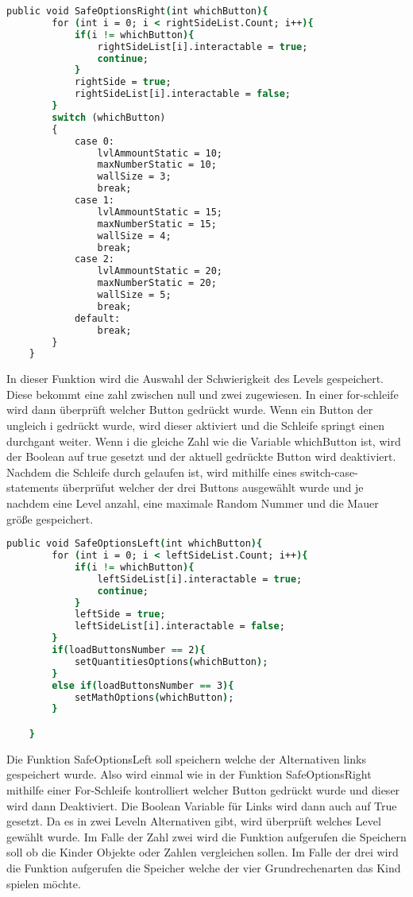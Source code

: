 \begin{lstlisting}[language=csh, caption={MenuPickLevelAdvanced.cs SafeOptionsRight Funktion}]
	public void SafeOptionsRight(int whichButton){
		for (int i = 0; i < rightSideList.Count; i++){
			if(i != whichButton){
				rightSideList[i].interactable = true;
				continue;
			}
			rightSide = true;
			rightSideList[i].interactable = false;
		}
		switch (whichButton)
		{
			case 0:
				lvlAmmountStatic = 10;
				maxNumberStatic = 10;
				wallSize = 3;
				break;
			case 1:
				lvlAmmountStatic = 15;
				maxNumberStatic = 15;
				wallSize = 4;
				break;
			case 2:
				lvlAmmountStatic = 20;
				maxNumberStatic = 20;
				wallSize = 5;
				break;
			default:
				break;
		}
	}
\end{lstlisting}
In dieser Funktion wird die Auswahl der Schwierigkeit des Levels gespeichert. Diese bekommt eine zahl zwischen null und zwei zugewiesen. In einer for-schleife wird dann überprüft welcher Button gedrückt wurde. Wenn ein Button der ungleich i gedrückt wurde, wird dieser aktiviert und die Schleife springt einen durchgant weiter. Wenn i die gleiche Zahl wie die Variable whichButton ist, wird der Boolean auf true gesetzt und der aktuell gedrückte Button wird deaktiviert.\\
Nachdem die Schleife durch gelaufen ist, wird mithilfe eines switch-case-statements überprüfut welcher der drei Buttons ausgewählt wurde und je nachdem eine Level anzahl, eine maximale Random Nummer und die Mauer größe gespeichert.\\
\begin{lstlisting}[language=csh, caption={MenuPickLevelAdvanced.cs SafeOptionsLeft Funktion}]
	public void SafeOptionsLeft(int whichButton){
		for (int i = 0; i < leftSideList.Count; i++){
			if(i != whichButton){
				leftSideList[i].interactable = true;
				continue;
			}
			leftSide = true;
			leftSideList[i].interactable = false;
		}
		if(loadButtonsNumber == 2){
			setQuantitiesOptions(whichButton);
		}
		else if(loadButtonsNumber == 3){
			setMathOptions(whichButton);
		}

	}
\end{lstlisting}
Die Funktion SafeOptionsLeft soll speichern welche der Alternativen links gespeichert wurde. Also wird einmal wie in der Funktion SafeOptionsRight mithilfe einer For-Schleife kontrolliert welcher Button gedrückt wurde und dieser wird dann Deaktiviert. Die Boolean Variable für Links wird dann auch auf True gesetzt. Da es in zwei Leveln Alternativen gibt, wird überprüft welches Level gewählt wurde. Im Falle der Zahl zwei wird die Funktion aufgerufen die Speichern soll ob die Kinder Objekte oder Zahlen vergleichen sollen. Im Falle der drei wird die Funktion aufgerufen die Speicher welche der vier Grundrechenarten das Kind spielen möchte. 
